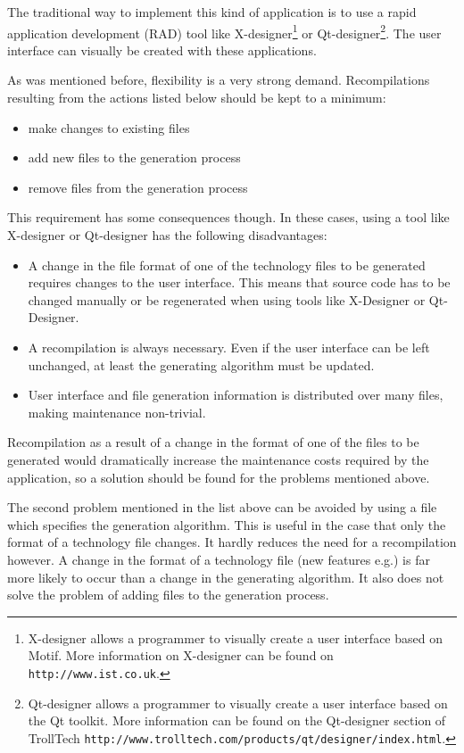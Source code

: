 The traditional way to implement this kind of application is to use a rapid
application development (RAD) tool like X-designer\footnote{X-designer allows a
programmer to visually create a user interface based on Motif. More information
on X-designer can be found on \texttt{http://www.ist.co.uk}.} or
Qt-designer\footnote{Qt-designer allows a programmer to visually create a user
interface based on the Qt toolkit. More information can be found on the
Qt-designer section of TrollTech \cite{Qt}
\texttt{http://www.trolltech.com/products/qt/designer/index.html}.}. The user
interface can visually be created with these applications.

As was mentioned before, flexibility is a very strong demand. Recompilations
resulting from the actions listed below should be kept to a minimum:
\begin{itemize}
\item make changes to existing files
\item add new files to the generation process
\item remove files from the generation process
\end{itemize}
This requirement has some consequences though. In these cases, using a tool
like X-designer or Qt-designer has the following disadvantages:
\begin{itemize}
    \item A change in the file format of one of the technology files to be
    generated requires changes to the user interface. This means that source
    code has to be changed manually or be regenerated when using tools like
    X-Designer or Qt-Designer.
    \item A recompilation is always necessary. Even if the user interface can
    be left unchanged, at least the generating algorithm must be updated.
    \item User interface and file generation information is distributed over
    many files, making maintenance non-trivial.
\end{itemize}
Recompilation as a result of a change in the format of one of the files to be
generated would dramatically increase the maintenance costs required by the
application, so a solution should be found for the problems mentioned above.

The second problem mentioned in the list above can be avoided by using a file
which specifies the generation algorithm. This is useful in the case that only
the format of a technology file changes. It hardly reduces the need for a
recompilation however. A change in the format of a technology file (new
features e.g.) is far more likely to occur than a change in the generating
algorithm. It also does not solve the problem of adding files to the generation
process.

